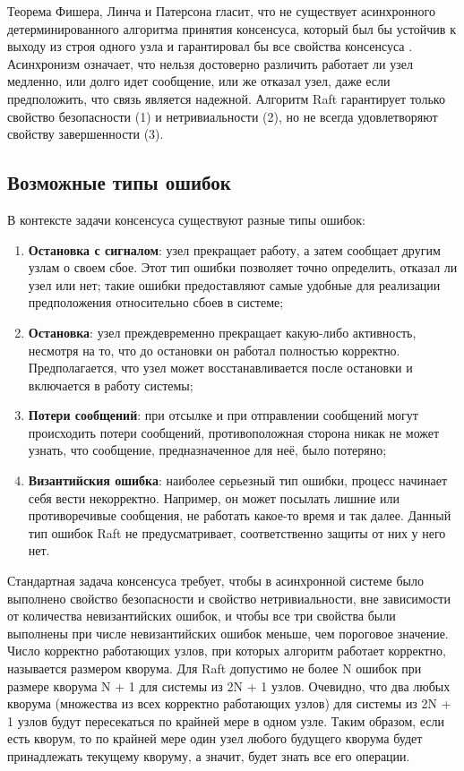 \documentclass[subf, href, colorlinks=true, 14pt,
times, mtpro, specialist]{disser}
\theoremstyle{definition}
\begin{document}
Теорема Фишера, Линча и Патерсона гласит, что не существует асинхронного детерминированного алгоритма принятия консенсуса, который был бы устойчив к выходу из строя одного узла и гарантировал бы все свойства консенсуса \cite{Theorem_FLP}. Асинхронизм означает, что нельзя достоверно различить работает ли узел медленно, или долго идет сообщение, или же отказал узел, даже если предположить, что связь является надежной. Алгоритм Raft гарантирует только свойство безопасности (1) и нетривиальности (2), но не всегда удовлетворяют свойству завершенности (3).

\subsection{Возможные типы ошибок}

В контексте задачи консенсуса существуют разные типы ошибок:
\begin{enumerate}
\item \textbf{Остановка с сигналом}: узел прекращает работу, а затем сообщает другим узлам о своем сбое. Этот тип ошибки позволяет точно определить, отказал ли узел или нет; такие ошибки предоставляют самые удобные для реализации предположения относительно сбоев в системе;

\item \textbf{Остановка}: узел преждевременно прекращает какую-либо активность, несмотря на то, что до остановки он работал полностью корректно. Предполагается, что узел может восстанавливается после остановки и включается в работу системы;

\item \textbf{Потери сообщений}: при отсылке и при отправлении сообщений могут происходить потери сообщений, противоположная сторона никак не может узнать, что сообщение, предназначенное для неё, было потеряно;

\item \textbf{Византийския ошибка}: наиболее серьезный тип ошибки, процесс начинает себя вести некорректно. Например, он может посылать лишние или противоречивые сообщения, не работать какое-то время и так далее. Данный тип ошибок Raft не предусматривает, соответственно защиты от них у него нет. 
\end{enumerate}

Стандартная задача консенсуса требует, чтобы в асинхронной системе было выполнено свойство безопасности и свойство нетривиальности, вне зависимости от количества невизантийских ошибок, и чтобы все три свойства были выполнены при числе невизантийских ошибок меньше, чем пороговое значение. Число корректно работающих узлов, при которых алгоритм работает корректно, называется размером кворума. Для Raft допустимо не более N ошибок при размере кворума N + 1 для системы из 2N + 1 узлов. Очевидно, что два любых кворума (множества из всех корректно работающих узлов) для системы из 2N + 1 узлов будут пересекаться по крайней мере в одном узле. Таким образом, если есть кворум, то по крайней мере один узел любого будущего кворума будет принадлежать текущему кворуму, а значит, будет знать
все его операции. 
\end{document}
